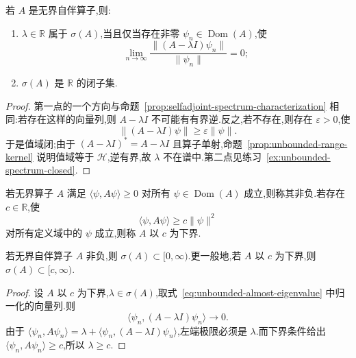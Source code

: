 \begin{proposition}[无界自伴算子的谱刻画]\label{prop:unbounded-spectrum-characterization}
若 \(A\) 是无界自伴算子,则:
\begin{enumerate}
\item \(\lambda\in\mathbb{R}\) 属于 \(\sigma(A)\),当且仅当存在非零 \(\psi_{n}\in\operatorname{Dom}(A)\),使
\[
\lim_{n\to\infty}\frac{\|(A-\lambda I)\psi_{n}\|}{\|\psi_{n}\|}=0;
\label{eq:unbounded-almost-eigenvalue}
\]
\item \(\sigma(A)\) 是 \(\mathbb{R}\) 的闭子集.
\end{enumerate}
\end{proposition}

\begin{proof}
第一点的一个方向与命题~\ref{prop:selfadjoint-spectrum-characterization} 相同:若存在这样的向量列,则 \(A-\lambda I\) 不可能有有界逆.反之,若不存在,则存在 \(\varepsilon>0\),使
\[
\|(A-\lambda I)\psi\|\geq\varepsilon\|\psi\|.
\]
于是值域闭;由于 \((A-\lambda I)^{*}=A-\lambda I\) 且算子单射,命题~\ref{prop:unbounded-range-kernel} 说明值域等于 \(\mathcal{H}\),逆有界,故 \(\lambda\) 不在谱中.第二点见练习~\ref{ex:unbounded-spectrum-closed}.
\end{proof}

\begin{definition}[非负与有下界算子]\label{def:unbounded-bounded-below}
若无界算子 \(A\) 满足 \(\langle\psi,A\psi\rangle\geq0\) 对所有 \(\psi\in\operatorname{Dom}(A)\) 成立,则称其非负.若存在 \(c\in\mathbb{R}\),使
\[
\langle\psi,A\psi\rangle\geq c\|\psi\|^{2}
\]
对所有定义域中的 \(\psi\) 成立,则称 \(A\) 以 \(c\) 为下界.
\end{definition}

\begin{proposition}[有下界自伴算子的谱]\label{prop:unbounded-spectrum-below}
若无界自伴算子 \(A\) 非负,则 \(\sigma(A)\subset[0,\infty)\).更一般地,若 \(A\) 以 \(c\) 为下界,则 \(\sigma(A)\subset[c,\infty)\).
\end{proposition}

\begin{proof}
设 \(A\) 以 \(c\) 为下界,\(\lambda\in\sigma(A)\),取式~\eqref{eq:unbounded-almost-eigenvalue} 中归一化的向量列.则
\[
\langle\psi_{n},(A-\lambda I)\psi_{n}\rangle\to0.
\]
由于 \(\langle\psi_{n},A\psi_{n}\rangle=\lambda+\langle\psi_{n},(A-\lambda I)\psi_{n}\rangle\),左端极限必须是 \(\lambda\).而下界条件给出 \(\langle\psi_{n},A\psi_{n}\rangle\geq c\),所以 \(\lambda\geq c\).
\end{proof}

